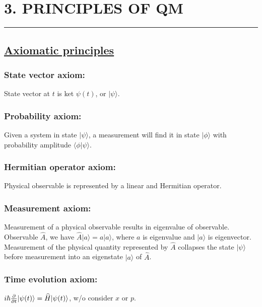 \section{3. PRINCIPLES OF QM} \hrule height 0.3pt \thinspace

\subsection{\underline{Axiomatic principles}}

\subsubsection{State vector axiom:} State vector at $t$ is ket $\psi(t)$, or $|\psi \rangle$.

\subsubsection{Probability axiom:} Given a system in state $|\psi \rangle$, a measurement will find it in state $|\phi \rangle$ with probability amplitude $\langle \phi | \psi \rangle$. 

\subsubsection{Hermitian operator axiom:} Physical observable is represented by a linear and Hermitian operator.

\subsubsection{Measurement axiom:} Measurement of a physical observable results in eigenvalue of observable. Observable $\widehat{A}$, we have $\widehat{A} | a \rangle = a | a \rangle$, where $a$ is eigenvalue and $|a \rangle$ is eigenvector. Measurement of the physical quantity represented by $\widehat{A}$ collapses the state $|\psi \rangle$ before measurement into an eigenstate $|a \rangle$ of $\widehat{A}$.

\subsubsection{Time evolution axiom:} $i \hbar \pdv{}{t} | \psi(t) \rangle = \widehat{H} |\psi(t) \rangle$, w/o consider $x$ or $p$.

